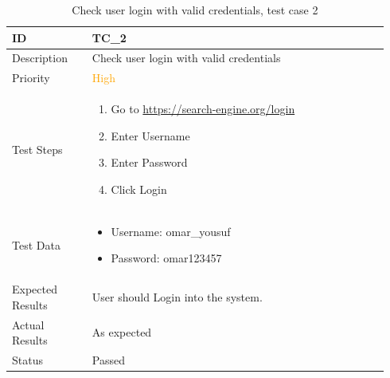 \documentclass{scrartcl}
\begin{document}
\begin{table}[H]
  \caption{Check user login with valid credentials, test case 2}
  \begin{tabular}{p{0.2\linewidth} | p{0.74\linewidth}}
    \toprule
    ID & TC\_2
    \\\midrule
    Description & Check user login with valid credentials
    \\\hline
    Priority & \textcolor{orange}{High}
    \\\hline
    Test Steps & {
                 \begin{enumerate}
                 \item Go to \url{https://search-engine.org/login}
                 \item Enter Username
                 \item Enter Password
                 \item Click Login
                 \end{enumerate}
                 }\vspace*{-\baselineskip}
    \\\hline
    Test Data & {
                \begin{itemize}
                \item Username: omar\_yousuf
                \item Password: omar123457
                \end{itemize}
                }\vspace*{-\baselineskip}
    \\\hline
    Expected Results & User should Login into the system.
    \\\hline
    Actual Results & As expected
    \\\hline
    Status & Passed
    \\\bottomrule
  \end{tabular}
\end{table}
\end{document}
